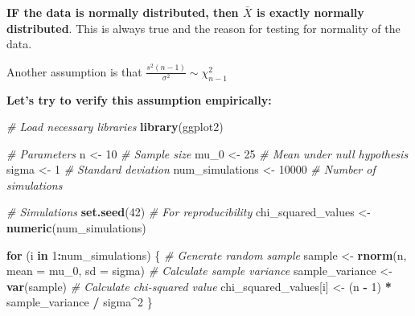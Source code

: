 \documentclass[
]{book}
\newenvironment{Shaded}{\begin{snugshade}}{\end{snugshade}}
\newcommand{\AttributeTok}[1]{\textcolor[rgb]{0.13,0.29,0.53}{#1}}
\newcommand{\CommentTok}[1]{\textcolor[rgb]{0.56,0.35,0.01}{\textit{#1}}}
\newcommand{\ControlFlowTok}[1]{\textcolor[rgb]{0.13,0.29,0.53}{\textbf{#1}}}
\newcommand{\DecValTok}[1]{\textcolor[rgb]{0.00,0.00,0.81}{#1}}
\newcommand{\FunctionTok}[1]{\textcolor[rgb]{0.13,0.29,0.53}{\textbf{#1}}}
\newcommand{\NormalTok}[1]{#1}
\newcommand{\OtherTok}[1]{\textcolor[rgb]{0.56,0.35,0.01}{#1}}
\newcommand{\SpecialCharTok}[1]{\textcolor[rgb]{0.81,0.36,0.00}{\textbf{#1}}}
\begin{document}
\textbf{IF the data is normally distributed, then \(\bar{X}\) is exactly normally distributed}.
This is always true
and the reason for testing for normality of the data.

Another assumption is that \(\frac{s^2(n-1)}{\sigma^2} \sim \chi^2_{n-1}\)

\textbf{Let's try to verify this assumption empirically:}

\begin{Shaded}
\begin{Highlighting}[]
\CommentTok{\# Load necessary libraries}
\FunctionTok{library}\NormalTok{(ggplot2)}

\CommentTok{\# Parameters}
\NormalTok{n }\OtherTok{\textless{}{-}} \DecValTok{10}            \CommentTok{\# Sample size}
\NormalTok{mu\_0 }\OtherTok{\textless{}{-}} \DecValTok{25}         \CommentTok{\# Mean under null hypothesis}
\NormalTok{sigma }\OtherTok{\textless{}{-}} \DecValTok{1}         \CommentTok{\# Standard deviation}
\NormalTok{num\_simulations }\OtherTok{\textless{}{-}} \DecValTok{10000}  \CommentTok{\# Number of simulations}

\CommentTok{\# Simulations}
\FunctionTok{set.seed}\NormalTok{(}\DecValTok{42}\NormalTok{)  }\CommentTok{\# For reproducibility}
\NormalTok{chi\_squared\_values }\OtherTok{\textless{}{-}} \FunctionTok{numeric}\NormalTok{(num\_simulations)}

\ControlFlowTok{for}\NormalTok{ (i }\ControlFlowTok{in} \DecValTok{1}\SpecialCharTok{:}\NormalTok{num\_simulations) \{}
  \CommentTok{\# Generate random sample}
\NormalTok{  sample }\OtherTok{\textless{}{-}} \FunctionTok{rnorm}\NormalTok{(n, }\AttributeTok{mean =}\NormalTok{ mu\_0, }\AttributeTok{sd =}\NormalTok{ sigma)}
  \CommentTok{\# Calculate sample variance}
\NormalTok{  sample\_variance }\OtherTok{\textless{}{-}} \FunctionTok{var}\NormalTok{(sample)}
  \CommentTok{\# Calculate chi{-}squared value}
\NormalTok{  chi\_squared\_values[i] }\OtherTok{\textless{}{-}}\NormalTok{ (n }\SpecialCharTok{{-}} \DecValTok{1}\NormalTok{) }\SpecialCharTok{*}\NormalTok{ sample\_variance }\SpecialCharTok{/}\NormalTok{ sigma}\SpecialCharTok{\^{}}\DecValTok{2}
\NormalTok{\}}


\end{Highlighting}
\end{Shaded}
\end{document}
